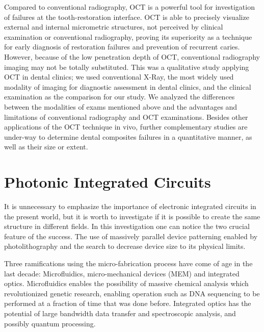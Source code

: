 \documentclass[12pt,twoside,english]{book}
\renewcommand{\~}{\perispomeni}%
\numberwithin{equation}{section}
\numberwithin{figure}{section}
\begin{document}
Compared to conventional radiography, OCT is a powerful tool for investigation of failures at the tooth-restoration interface. OCT is able to precisely visualize external and internal micrometric structures, not perceived by clinical examination or conventional radiography, proving its superiority as a technique for early diagnosis of restoration failures and prevention of recurrent caries. However, because of the low penetration depth of OCT, conventional radiography imaging may not be totally substituted. This was a qualitative study applying OCT in dental clinics; we used conventional X-Ray, the most widely used modality of imaging for diagnostic assessment in dental clinics, and the clinical examination as the comparison for our study. We analyzed the differences between the modalities of exams mentioned above and the advantages and limitations of conventional radiography and OCT examinations. Besides other applications of the OCT technique in vivo, further complementary studies are under-way to determine dental composites failures in a quantitative manner, as well as their size or extent.

\chapter{Photonic Integrated Circuits}


It is unnecessary to emphasize the importance of electronic integrated circuits in the present world, but it is worth to investigate if it is possible to create the same structure in different fields. In this investigation one can notice the two crucial feature of the success. The use of massively parallel device patterning enabled by photolithography and the search to decrease device size to its physical limits.

Three ramifications using the micro-fabrication process have come of age in the last decade: Microfluidics, micro-mechanical devices (MEM) and integrated optics. Microfluidics enables the possibility of massive chemical analysis which revolutionized genetic research, enabling operation such as DNA sequencing to be performed at a fraction of time that was done before. Integrated optics has the potential of large bandwidth data transfer and spectroscopic analysis, and possibly quantum processing.
\end{document}
